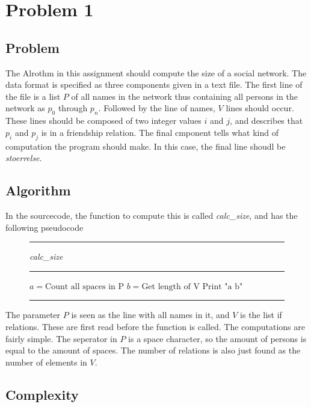 \section{Problem 1}

\subsection{Problem}

The Alrothm in this assignment should compute the size of a
social network. The data format is specified as
three components given in a text file. The first line of the file is
a list $P$ of all names in the network thus containing all
persons in the network as $p_0$ through $p_n$. Followed by the line of names, 
$V$ lines should occur. These lines should be composed of two integer 
values $i$ and $j$, and describes that $p_i$ and $p_j$ is in a friendship 
relation. The final cmponent tells what kind of computation the program should make.
In this case, the final line shoudl be \textit{stoerrelse}.


\subsection{Algorithm}

In the sourcecode, the function to compute this is called \textit{calc\_size},
and has the following pseudocode

\begin{figure}[ht]
\hrule
\vspace{0.2cm}
{\centering  \textit{calc\_size}}
\vspace{0.2cm}
\hrule
\begin{algorithmic}

\State $a = \text{Count all spaces in P}$
\State $b = \text{Get length of V}$
\State $\text{Print "a b"}$ 
\EndFunction
\end{algorithmic}
\hrule
\end{figure}

The parameter $P$ is seen as the line with all names in it, and
$V$ is the list if relations. These are first read before the 
function is called. The computations are fairly simple. The
seperator in $P$ is a space character, so the amount of 
persons is equal to the amount of spaces. The number of relations
is also just found as the number of elements in $V$.

\subsection{Complexity}

